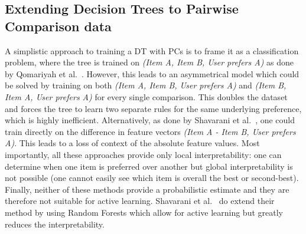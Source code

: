 \documentclass{article}
\begin{document}
\subsection{Extending Decision Trees to Pairwise Comparison data}\label{sec:PWC_DT}
A simplistic approach to training a DT with PCs is to frame it as a classification problem, where the tree is trained on \textit{(Item A, Item B, User prefers A)} as done by Qomariyah et al.~\cite{qomariyah_comparative_2020}. However, this leads to an asymmetrical model which could be solved by training on both \textit{(Item A, Item B, User prefers A)} and \textit{(Item B, Item A, User prefers A)} for every single comparison. This doubles the dataset and forces the tree to learn two separate rules for the same underlying preference, which is highly inefficient. Alternatively, as done by Shavarani et al.~\cite{shavarani2023interactive}, one could train directly on the difference in feature vectors \textit{(Item A - Item B, User prefers A)}. This leads to a loss of context of the absolute feature values. Most importantly, all these approaches provide only local interpretability: one can determine when one item is preferred over another but global interpretability is not possible (one cannot easily see which item is overall the best or second-best). Finally, neither of these methods provide a probabilistic estimate and they are therefore not suitable for active learning. Shavarani et al.~\cite{shavarani2025integrating} do extend their method by using Random Forests which allow for active learning but greatly reduces the interpretability.
\end{document}
